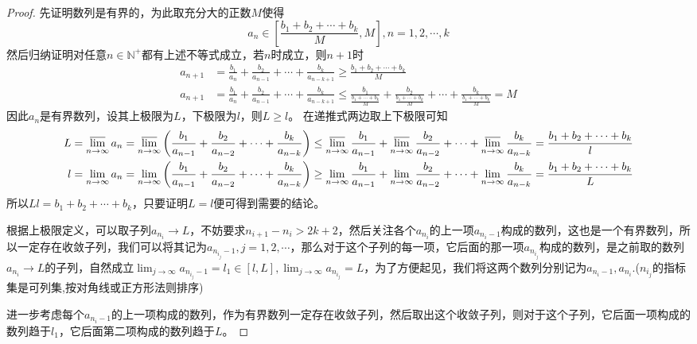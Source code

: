 \documentclass[../../main.tex]{subfiles}
\begin{document}
\begin{proof}
先证明数列是有界的，为此取充分大的正数\(M\)使得
\[a_n\in\left[\frac{b_1 + b_2+\cdots + b_k}{M},M\right],n = 1,2,\cdots,k\]
然后归纳证明对任意\(n\in\mathbb{N}^+\)都有上述不等式成立，若\(n\)时成立，则\(n + 1\)时
\begin{align*}
a_{n + 1}&=\frac{b_1}{a_n}+\frac{b_2}{a_{n - 1}}+\cdots+\frac{b_k}{a_{n - k+1}}\geq\frac{b_1 + b_2+\cdots + b_k}{M}\\
a_{n + 1}&=\frac{b_1}{a_n}+\frac{b_2}{a_{n - 1}}+\cdots+\frac{b_k}{a_{n - k+1}}\leq\frac{b_1}{\frac{b_1 + \cdots + b_k}{M}}+\frac{b_2}{\frac{b_1 + \cdots + b_k}{M}}+\cdots+\frac{b_k}{\frac{b_1 + \cdots + b_k}{M}}=M
\end{align*}
因此\(a_n\)是有界数列，设其上极限为\(L\)，下极限为\(l\)，则\(L\geq l\)。
在递推式两边取上下极限可知
\begin{align*}
L&=\varlimsup_{n\rightarrow\infty}a_n=\varlimsup_{n\rightarrow\infty}\left(\frac{b_1}{a_{n - 1}}+\frac{b_2}{a_{n - 2}}+\cdots+\frac{b_k}{a_{n - k}}\right)\leq\varlimsup_{n\rightarrow\infty}\frac{b_1}{a_{n - 1}}+\varlimsup_{n\rightarrow\infty}\frac{b_2}{a_{n - 2}}+\cdots+\varlimsup_{n\rightarrow\infty}\frac{b_k}{a_{n - k}}=\frac{b_1 + b_2+\cdots + b_k}{l}\\
l&=\lim_{n\rightarrow\infty}a_n=\lim_{n\rightarrow\infty}\left(\frac{b_1}{a_{n - 1}}+\frac{b_2}{a_{n - 2}}+\cdots+\frac{b_k}{a_{n - k}}\right)\geq\lim_{n\rightarrow\infty}\frac{b_1}{a_{n - 1}}+\lim_{n\rightarrow\infty}\frac{b_2}{a_{n - 2}}+\cdots+\lim_{n\rightarrow\infty}\frac{b_k}{a_{n - k}}=\frac{b_1 + b_2+\cdots + b_k}{L}
\end{align*}
所以\(Ll=b_1 + b_2+\cdots + b_k\)，只要证明\(L = l\)便可得到需要的结论。

根据上极限定义，可以取子列\(a_{n_i}\to L\)，不妨要求\(n_{i + 1}-n_i>2k + 2\)，然后关注各个\(a_{n_i}\)的上一项\(a_{n_i - 1}\)构成的数列，这也是一个有界数列，所以一定存在收敛子列，我们可以将其记为\(a_{n_{i_j}-1},j = 1,2,\cdots\)，那么对于这个子列的每一项，它后面的那一项\(a_{n_{i_j}}\)构成的数列，是之前取的数列\(a_{n_i}\to L\)的子列，自然成立\(\lim_{j\rightarrow\infty}a_{n_{i_j}-1}=l_1\in[l,L],\lim_{j\rightarrow\infty}a_{n_{i_j}} = L\)，为了方便起见，我们将这两个数列分别记为\(a_{n_{i}-1},a_{n_{i}}\).($n_{i_j}$的指标集是可列集,按对角线或正方形法则排序)

进一步考虑每个\(a_{n_{i}-1}\)的上一项构成的数列，作为有界数列一定存在收敛子列，然后取出这个收敛子列，则对于这个子列，它后面一项构成的数列趋于\(l_1\)，它后面第二项构成的数列趋于\(L\)。


\end{proof}
\end{document}
